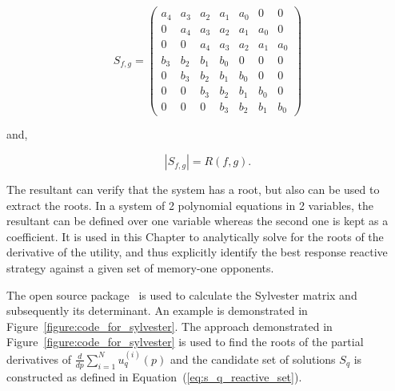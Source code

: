 \begin{equation}
S_{f,g} = \begin{pmatrix} a_{4} & a_{3} & a_{2} & a_{1} & a_{0} & 0     & 0    \\
                          0     & a_{4} & a_{3} & a_{2} & a_{1} & a_{0} & 0    \\
                          0     & 0     & a_{4} & a_{3} & a_{2} & a_{1} & a_{0} \\
                          b_{3} & b_{2} & b_{1} & b_{0} &     0 & 0     & 0     \\
                          0     & b_{3} & b_{2} & b_{1} & b_{0} & 0     & 0     \\
                          0     & 0     & b_{3} & b_{2} & b_{1} & b_{0} & 0     \\
                          0     & 0     & 0     & b_{3} & b_{2} & b_{1} & b_{0}
                        \end{pmatrix}
\end{equation}

and,

\[|S_{f, g}| = R(f, g).\]

The resultant can verify that the system has a root, but also can be
used to extract the roots. In a system of 2 polynomial equations in 2
variables, the resultant can be defined over one variable whereas the second one
is kept as a coefficient. It is used in this Chapter to analytically solve for
the roots of the derivative of the utility, and thus explicitly identify the best response
reactive strategy against a given set of memory-one opponents.

The open source package~\cite{sympy} is used to calculate the Sylvester matrix
and subsequently its determinant. An example is demonstrated in
Figure~\ref{figure:code_for_sylvester}.
The approach demonstrated in Figure~\ref{figure:code_for_sylvester} is used to
find the roots of the partial derivatives of \(\frac{d}{dp} \sum\limits_{i=1} ^
N  u_q^{(i)}(p)\) and the candidate set of solutions \(S_q\) is constructed
as defined in Equation~(\ref{eq:s_q_reactive_set}).

